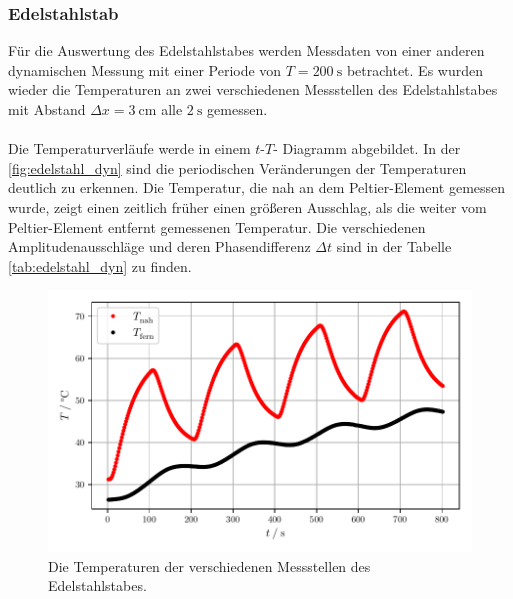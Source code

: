 \subsubsection{Edelstahlstab}
Für die Auswertung des Edelstahlstabes werden Messdaten von einer anderen dynamischen Messung mit einer Periode von $T = \SI{200}{\second}$ betrachtet.
Es wurden wieder die Temperaturen an zwei verschiedenen Messstellen des Edelstahlstabes mit Abstand $\Delta x = \SI{3}{\centi\metre}$ alle $ \SI{2}{\second}$ gemessen.\\
\\
Die Temperaturverläufe werde in einem $t$-$T$- Diagramm abgebildet. 
In der \autoref{fig:edelstahl_dyn} sind die periodischen Veränderungen der Temperaturen deutlich zu erkennen.
Die Temperatur, die nah an dem Peltier-Element gemessen wurde, zeigt einen zeitlich früher einen größeren Ausschlag, als die weiter vom Peltier-Element entfernt gemessenen Temperatur.
Die verschiedenen Amplitudenausschläge und deren Phasendifferenz $\Delta t$ sind in der Tabelle \ref{tab:edelstahl_dyn} zu finden. 
\begin{figure}
  \centering
  \includegraphics{build/plot_edelstahl.pdf}
  \caption{Die Temperaturen der verschiedenen Messstellen des Edelstahlstabes.}
  \label{fig:edelstahl_dyn}
\end{figure}

